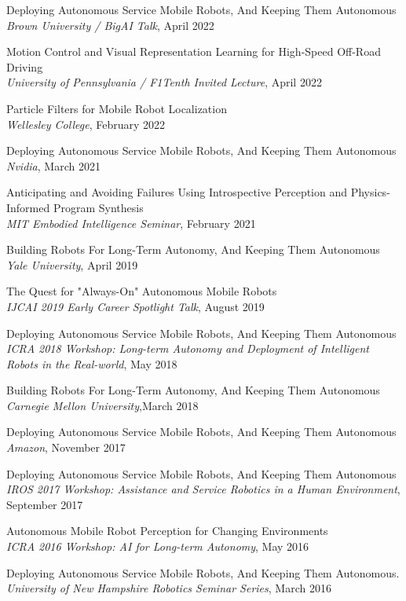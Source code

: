\documentclass[Times]{article}
\begin{document}
Deploying Autonomous Service Mobile Robots, And Keeping Them Autonomous
\\
{\em Brown University / BigAI Talk}, April 2022

Motion Control and Visual Representation Learning for High-Speed Off-Road Driving
\\
{\em University of Pennsylvania / F1Tenth Invited Lecture}, April 2022

Particle Filters for Mobile Robot Localization
\\
{\em Wellesley College}, February 2022

Deploying Autonomous Service Mobile Robots, And Keeping Them Autonomous
\\
{\em Nvidia}, March 2021

Anticipating and Avoiding Failures Using Introspective Perception and Physics-Informed Program Synthesis\\
{\em MIT Embodied Intelligence Seminar}, February 2021

Building Robots For Long-Term Autonomy, And Keeping Them Autonomous\\
{\em Yale University}, April 2019

The Quest for "Always-On" Autonomous Mobile Robots\\
{\em IJCAI 2019 Early Career Spotlight Talk}, August 2019

Deploying Autonomous Service Mobile Robots, And Keeping Them Autonomous\\
{\em ICRA 2018 Workshop: Long-term Autonomy and Deployment of Intelligent Robots
in the Real-world}, May 2018

Building Robots For Long-Term Autonomy, And Keeping Them Autonomous\\
{\em Carnegie Mellon University},March 2018

Deploying Autonomous Service Mobile Robots, And Keeping Them Autonomous\\
{\em Amazon}, November 2017

Deploying Autonomous Service Mobile Robots, And Keeping Them Autonomous\\
{\em IROS 2017 Workshop: Assistance and Service Robotics in a Human
Environment}, September 2017

Autonomous Mobile Robot Perception for Changing Environments\\
{\em ICRA 2016 Workshop: AI for Long-term Autonomy}, May 2016

Deploying Autonomous Service Mobile Robots, And Keeping Them Autonomous.\\
{\em University of New Hampshire Robotics Seminar Series}, March 2016
\end{document}
